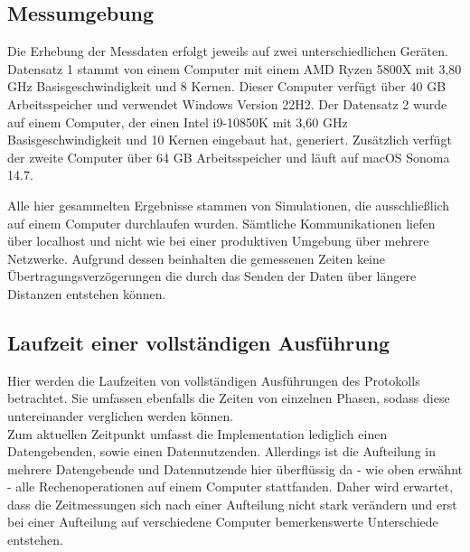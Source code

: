 \documentclass{scrreprt}
\begin{document}
\subsection{Messumgebung}
\label{subsec:timeMessureComputer}
Die Erhebung der Messdaten erfolgt jeweils auf zwei unterschiedlichen Geräten. Datensatz 1 stammt von einem Computer mit einem AMD Ryzen 5800X mit 3,80 GHz Basisgeschwindigkeit und 8 Kernen. Dieser Computer verfügt über 40 GB Arbeitsspeicher und verwendet Windows Version 22H2. Der Datensatz 2 wurde auf einem Computer, der einen Intel i9-10850K mit 3,60 GHz Basisgeschwindigkeit und 10 Kernen eingebaut hat, generiert. Zusätzlich verfügt der zweite Computer über 64 GB Arbeitsspeicher und läuft auf macOS Sonoma 14.7.

Alle hier gesammelten Ergebnisse stammen von Simulationen, die ausschließlich auf einem Computer durchlaufen wurden. Sämtliche Kommunikationen liefen über localhost und nicht wie bei einer produktiven Umgebung über mehrere Netzwerke. Aufgrund dessen beinhalten die gemessenen Zeiten keine Übertragungsverzögerungen die durch das Senden der Daten über längere Distanzen entstehen können.


\subsection{Laufzeit einer vollständigen Ausführung}
Hier werden die Laufzeiten von vollständigen Ausführungen des Protokolls betrachtet. Sie umfassen ebenfalls die Zeiten von einzelnen Phasen, sodass diese untereinander verglichen werden können.\\

Zum aktuellen Zeitpunkt umfasst die Implementation lediglich einen Datengebenden, sowie einen Datennutzenden. Allerdings ist die Aufteilung in mehrere Datengebende und Datennutzende hier überflüssig da - wie oben erwähnt - alle Rechenoperationen auf einem Computer stattfanden. Daher wird erwartet, dass die Zeitmessungen sich nach einer Aufteilung nicht stark verändern und erst bei einer Aufteilung auf verschiedene Computer bemerkenswerte Unterschiede entstehen.\\
\end{document}
